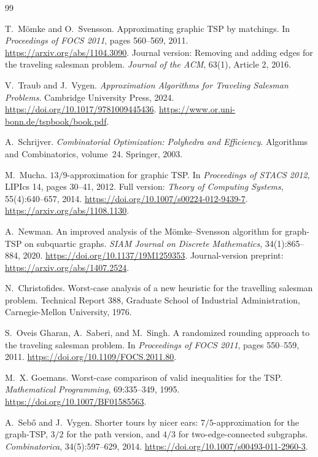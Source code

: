 \documentclass[11pt]{amsart}
\newcommand{\1}{\mathbbm{1}}
\begin{document}
\begin{thebibliography}{99}

T.~M\"omke and O.~Svensson.
Approximating graphic TSP by matchings.
In \emph{Proceedings of FOCS 2011}, pages 560--569, 2011.
\url{https://arxiv.org/abs/1104.3090}.
Journal version: Removing and adding edges for the traveling salesman
problem. \emph{Journal of the ACM}, 63(1), Article 2, 2016.

V.~Traub and J.~Vygen.
\emph{Approximation Algorithms for Traveling Salesman Problems}.
Cambridge University Press, 2024.
\url{https://doi.org/10.1017/9781009445436}.
\url{https://www.or.uni-bonn.de/tspbook/book.pdf}.

A.~Schrijver.
\emph{Combinatorial Optimization: Polyhedra and Efficiency}.
Algorithms and Combinatorics, volume~24. Springer, 2003.

M.~Mucha.
$13/9$-approximation for graphic TSP.
In \emph{Proceedings of STACS 2012}, LIPIcs 14, pages 30--41, 2012.
Full version: \emph{Theory of Computing Systems}, 55(4):640--657, 2014.
\url{https://doi.org/10.1007/s00224-012-9439-7}.
\url{https://arxiv.org/abs/1108.1130}.

A.~Newman.
An improved analysis of the M\"omke--Svensson algorithm for graph-TSP
on subquartic graphs.
\emph{SIAM Journal on Discrete Mathematics}, 34(1):865--884, 2020.
\url{https://doi.org/10.1137/19M1259353}.
Journal-version preprint: \url{https://arxiv.org/abs/1407.2524}.

N.~Christofides.
Worst-case analysis of a new heuristic for the travelling salesman problem.
Technical Report 388, Graduate School of Industrial Administration,
Carnegie-Mellon University, 1976.

S.~Oveis Gharan, A.~Saberi, and M.~Singh.
A randomized rounding approach to the traveling salesman problem.
In \emph{Proceedings of FOCS 2011}, pages 550--559, 2011.
\url{https://doi.org/10.1109/FOCS.2011.80}.

M.~X. Goemans.
Worst-case comparison of valid inequalities for the TSP.
\emph{Mathematical Programming}, 69:335--349, 1995.
\url{https://doi.org/10.1007/BF01585563}.

A.~Seb\H{o} and J.~Vygen.
Shorter tours by nicer ears: $7/5$-approximation for the graph-TSP,
$3/2$ for the path version, and $4/3$ for two-edge-connected subgraphs.
\emph{Combinatorica}, 34(5):597--629, 2014.
\url{https://doi.org/10.1007/s00493-011-2960-3}.


\end{thebibliography}
\end{document}
